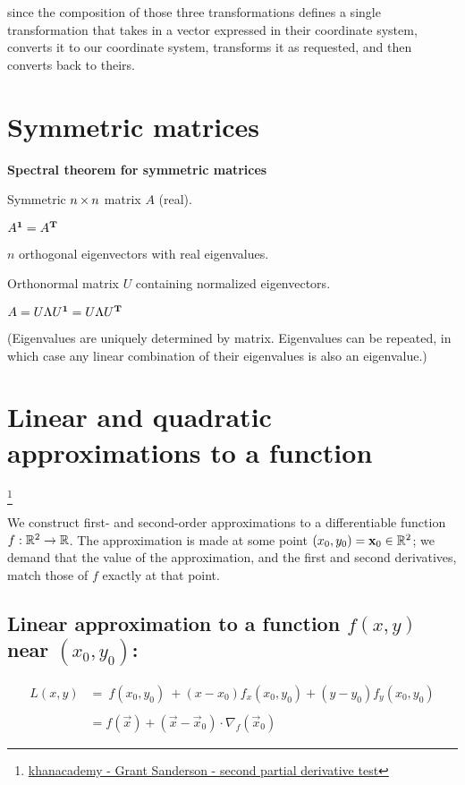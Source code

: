since the composition of those three transformations defines a single
transformation that takes in a vector expressed in their coordinate system,
converts it to our coordinate system, transforms it as requested, and then
converts back to theirs.


\section{Symmetric matrices}

\textbf{Spectral theorem for symmetric matrices}

Symmetric $n \operatorname{\times} n$ matrix $A$ (real).

$A^{\mathbf 1} = A^{\mathbf{T}}$

$n$ orthogonal eigenvectors with real eigenvalues.

Orthonormal matrix $U$ containing normalized eigenvectors.

$A = U\Lambda U^{\mathbf 1} = U\Lambda U^{\mathbf{T}}$

(Eigenvalues are uniquely determined by matrix. Eigenvalues can be repeated, in which case any linear combination of their
eigenvalues is also an eigenvalue.)



\section{Linear and quadratic approximations to a function}
\footnote{
  \href{https://www.khanacademy.org/math/multivariable-calculus/applications-of-multivariable-derivatives/optimizing-multivariable-functions/a/reasoning-behind-the-second-partial-derivative-test}{khanacademy - Grant Sanderson - second partial derivative test}
}




We construct first- and second-order approximations to a differentiable
function $f: \mathbb{R}^2 \rightarrow \mathbb{R}$. The approximation is made at some point
$(x_0, y_0) = \mathbf x_0 \in \mathbb{R}^2$; we demand that the value of the approximation, and the
first and second derivatives, match those of $f$ exactly at that point.

\subsection{Linear approximation to a function $f(x, y)$ near $(x_0, y_0)$:}

\begin{align*}
L(x, y) &=
~
f(x_0, y_0) ~+
(x - x_0)f_x(x_0,y_0) +
(y - y_0)f_y(x_0,y_0)
\\\\
&= f(\vec x) + (\vec x - \vec x_0) \cdot \nabla_f(\vec x_0)
\end{align*}

